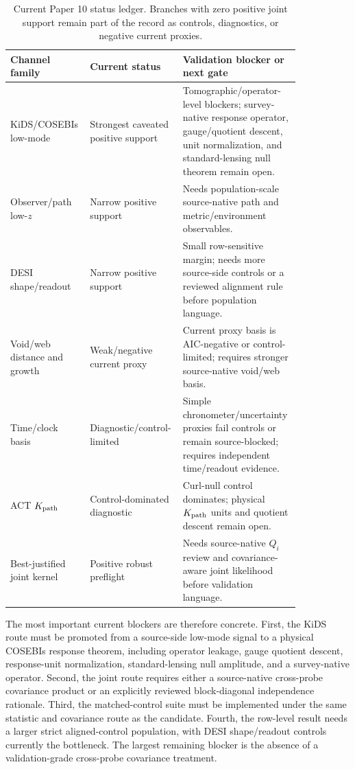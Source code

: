 \documentclass[11pt]{article}
\begin{document}
\begin{table}[t]
\centering
\small
\caption{Current Paper 10 status ledger.  Branches with zero positive joint
support remain part of the record as controls, diagnostics, or negative current
proxies.}
\label{tab:paper10-status-ledger}
\begin{tabular}{p{0.23\linewidth}p{0.23\linewidth}p{0.38\linewidth}}
\toprule
Channel family & Current status & Validation blocker or next gate \\
\midrule
KiDS/COSEBIs low-mode & Strongest caveated positive support &
Tomographic/operator-level blockers; survey-native response operator,
gauge/quotient descent, unit normalization, and standard-lensing null theorem
remain open. \\
Observer/path low-\(z\) & Narrow positive support &
Needs population-scale source-native path and metric/environment observables. \\
DESI shape/readout & Narrow positive support &
Small row-sensitive margin; needs more source-side controls or a reviewed
alignment rule before population language. \\
Void/web distance and growth & Weak/negative current proxy &
Current proxy basis is AIC-negative or control-limited; requires stronger
source-native void/web basis. \\
Time/clock basis & Diagnostic/control-limited &
Simple chronometer/uncertainty proxies fail controls or remain source-blocked;
requires independent time/readout evidence. \\
ACT \(K_{\rm path}\) & Control-dominated diagnostic &
Curl-null control dominates; physical \(K_{\rm path}\) units and quotient
descent remain open. \\
Best-justified joint kernel & Positive robust preflight &
Needs source-native \(Q_i\) review and covariance-aware joint likelihood before
validation language. \\
\bottomrule
\end{tabular}
\end{table}

The most important current blockers are therefore concrete.  First, the KiDS
route must be promoted from a source-side low-mode signal to a physical
COSEBIs response theorem, including operator leakage, gauge quotient descent,
response-unit normalization, standard-lensing null amplitude, and a
survey-native operator.  Second, the joint route requires either a source-native
cross-probe covariance product or an explicitly reviewed block-diagonal
independence rationale.  Third, the matched-control suite must be implemented
under the same statistic and covariance route as the candidate.  Fourth, the
row-level result needs a larger strict aligned-control population, with DESI
shape/readout controls currently the bottleneck.
The largest remaining blocker is the absence of a validation-grade cross-probe
covariance treatment.
\end{document}
